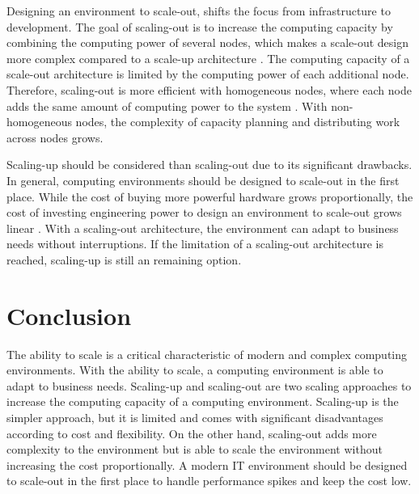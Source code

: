\documentclass{article}
\begin{document}
Designing an environment to scale-out, shifts the focus from infrastructure to development. The goal of scaling-out is to increase the computing capacity by combining the computing power of several nodes, which makes a scale-out design more complex compared to a scale-up architecture \cite{Wilder2012CloudPatterns}. The computing capacity of a scale-out architecture is limited by the computing power of each additional node. Therefore, scaling-out is more efficient with homogeneous nodes, where each node adds the same amount of computing power to the system \cite{Wilder2012CloudPatterns}. With non-homogeneous nodes, the complexity of capacity planning and distributing work across nodes grows.


Scaling-up should be considered than scaling-out due to its significant drawbacks. In general, computing environments should be designed to scale-out in the first place. While the cost of buying more powerful hardware grows proportionally, the cost of investing engineering power to design an environment to scale-out grows linear \cite{Abbot2011ScalabilityRules}. With a scaling-out architecture, the environment can adapt to business needs without interruptions. If the limitation of a scaling-out architecture is reached, scaling-up is still an remaining option.


\section{Conclusion}
The ability to scale is a critical characteristic of modern and complex computing environments. With the ability to scale, a computing environment is able to adapt to business needs. Scaling-up and scaling-out are two scaling approaches to increase the computing capacity of a computing environment. Scaling-up is the simpler approach, but it is limited and comes with significant disadvantages according to cost and flexibility. On the other hand, scaling-out adds more complexity to the environment but is able to scale the environment without increasing the cost proportionally. A modern IT environment should be designed to scale-out in the first place to handle performance spikes and keep the cost low.


\pagebreak


\end{document}
